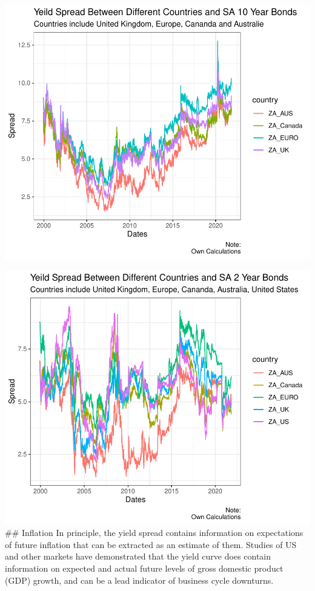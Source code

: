 \documentclass[11pt,preprint, authoryear]{elsarticle}
\numberwithin{equation}{section}
\numberwithin{figure}{section}
\numberwithin{table}{section}
\begin{document}
\includegraphics{Question1_files/figure-latex/unnamed-chunk-4-1.pdf}

\includegraphics{Question1_files/figure-latex/unnamed-chunk-5-1.pdf}
\#\# Inflation In principle, the yield spread contains information on
expectations of future inflation that can be extracted as an estimate of
them. Studies of US and other markets have demonstrated that the yield
curve does contain information on expected and actual future levels of
gross domestic product (GDP) growth, and can be a lead indicator of
business cycle downturns.
\end{document}
